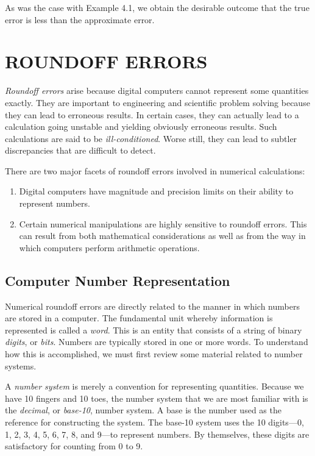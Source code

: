 \documentclass[../main.tex]{subfiles}
\begin{document}
\noindent
As was the case with Example 4.1, we obtain the desirable outcome that the true error is
less than the approximate error.
\vspace{10 mm}

\section{ROUNDOFF ERRORS}
\emph{Roundoff errors} arise because digital computers cannot represent some quantities exactly.
They are important to engineering and scientific problem solving because they
can lead to erroneous results. In certain cases, they can actually lead to a calculation
going unstable and yielding obviously erroneous results. Such calculations are said to
be \emph{ill-conditioned}. Worse still, they can lead to subtler discrepancies that are difficult
to detect.

There are two major facets of roundoff errors involved in numerical calculations:

\begin{enumerate}
    \item Digital computers have magnitude and precision limits on their ability to represent
    numbers.
    \item Certain numerical manipulations are highly sensitive to roundoff errors. This can result
    from both mathematical considerations as well as from the way in which computers
    perform arithmetic operations.
\end{enumerate}

\subsection{Computer Number Representation}
Numerical roundoff errors are directly related to the manner in which numbers are stored
in a computer. The fundamental unit whereby information is represented is called a \emph{word}.
This is an entity that consists of a string of binary \emph{digits}, or \emph{bits}. Numbers are typically
stored in one or more words. To understand how this is accomplished, we must first review
some material related to number systems.

A \emph{number system} is merely a convention for representing quantities. Because we have
10 fingers and 10 toes, the number system that we are most familiar with is the \emph{decimal}, or
\emph{base-10}, number system. A base is the number used as the reference for constructing the
system. The base-10 system uses the 10 digits---0, 1, 2, 3, 4, 5, 6, 7, 8, and 9---to represent
numbers. By themselves, these digits are satisfactory for counting from 0 to 9.
\end{document}
